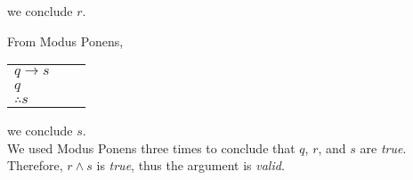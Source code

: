 we conclude $r$.

From Modus Ponens,

\begin{table}[h]
\centering
\begin{tabular}{l@{\,}l@{\,}l@{\,}}
$q \rightarrow s$ & & \\
$q$ & & \\
\hline
$\therefore s$ & &
\end{tabular}
\end{table}

we conclude $s$.\\

We used Modus Ponens three times to conclude that $q$, $r$, and $s$ are \textit{true}.  Therefore, $r \land s$ is \textit{true}, thus the argument is \textit{valid}.


